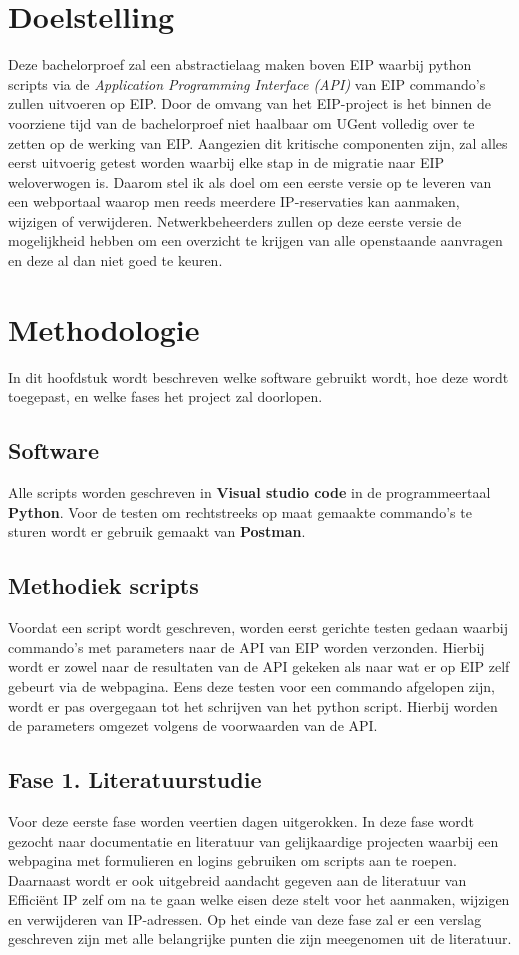 \documentclass{hogent-article}
\begin{document}
\section{Doelstelling}
\label{sec:doelstelling}
Deze bachelorproef zal een abstractielaag maken boven EIP waarbij python scripts via de \textit{Application Programming Interface (API)} van EIP commando's zullen uitvoeren op EIP.
Door de omvang van het EIP-project is het binnen de voorziene tijd van de bachelorproef niet haalbaar om UGent volledig over te zetten op de werking van EIP. Aangezien dit kritische componenten zijn, zal alles eerst uitvoerig getest worden waarbij elke stap in de migratie naar EIP weloverwogen is.
Daarom stel ik als doel om een eerste versie op te leveren van een webportaal waarop men reeds meerdere IP-reservaties kan aanmaken, wijzigen of verwijderen. Netwerkbeheerders zullen op deze eerste versie de mogelijkheid hebben om een overzicht te krijgen van alle openstaande aanvragen en deze al dan niet goed te keuren.

\section{Methodologie}
\label{sec:methodologie}
In dit hoofdstuk wordt beschreven welke software gebruikt wordt, hoe deze wordt toegepast, en welke fases het project zal doorlopen.

\subsection{Software}
Alle scripts worden geschreven in \textbf{Visual studio code} in de programmeertaal \textbf{Python}.
Voor de testen om rechtstreeks op maat gemaakte commando's te sturen wordt er gebruik gemaakt van \textbf{Postman}.

\subsection{Methodiek scripts}
Voordat een script wordt geschreven, worden eerst gerichte testen gedaan waarbij commando's met parameters naar de API van EIP worden verzonden. Hierbij wordt er zowel naar de resultaten van de API gekeken als naar wat er op EIP zelf gebeurt via de webpagina. Eens deze testen voor een commando afgelopen zijn, wordt er pas overgegaan tot het schrijven van het python script. Hierbij worden de parameters omgezet volgens de voorwaarden van de API.

\subsection{Fase 1. Literatuurstudie}
Voor deze eerste fase worden veertien dagen uitgerokken. In deze fase wordt gezocht naar documentatie en literatuur van gelijkaardige projecten waarbij een webpagina met formulieren en logins gebruiken om scripts aan te roepen. Daarnaast wordt er ook uitgebreid aandacht gegeven aan de literatuur van Efficiënt IP zelf om na te gaan welke eisen deze stelt voor het aanmaken, wijzigen en verwijderen van IP-adressen.
Op het einde van deze fase zal er een verslag geschreven zijn met alle belangrijke punten die zijn meegenomen uit de literatuur.
\end{document}
